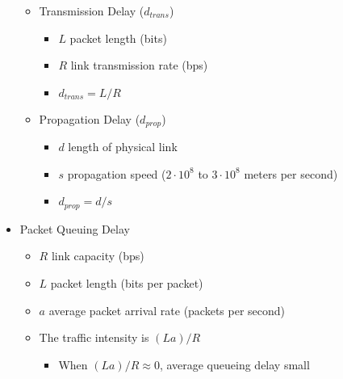 \begin{itemize}
\begin{itemize}
\begin{itemize}
        \end{itemize}

      \item Transmission Delay ($d_{trans}$)

        \begin{itemize}

          \item $L$ packet length (bits)

          \item $R$ link transmission rate (bps)

          \item $d_{trans}=L/R$

        \end{itemize}

      \item Propagation Delay ($d_{prop}$)

        \begin{itemize}

          \item $d$ length of physical link

          \item $s$ propagation speed ($2\cdot10^{8}$ to $3\cdot10^8$ meters per second)

          \item $d_{prop}=d/s$

        \end{itemize}

    \end{itemize}

    \item Packet Queuing Delay

    \begin{itemize}

      \item $R$ link capacity (bps)

      \item $L$ packet length (bits per packet)

      \item $a$ average packet arrival rate (packets per second)

      \item The traffic intensity is $(La)/R$

        \begin{itemize}

          \item When $(La)/R\approx 0$, average queueing delay small


\end{itemize}
\end{itemize}
\end{itemize}
